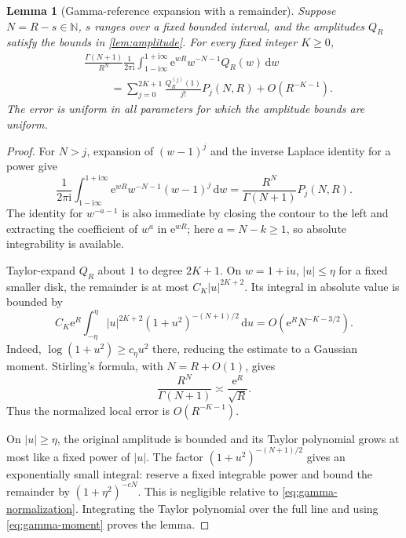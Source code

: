 \documentclass[11pt,a4paper]{article}
\numberwithin{equation}{section}
\newtheorem{lemma}[theorem]{Lemma}
\theoremstyle{definition}
\newcommand{\N}{\mathbb N}
\newcommand{\dd}{\,\mathrm d}
\newcommand{\ii}{\mathrm i}
\newcommand{\ee}{\mathrm e}
\begin{document}
\begin{lemma}[Gamma-reference expansion with a remainder]
\label{lem:gamma}
Suppose $N=R-s\in\N$, $s$ ranges over a fixed bounded interval, and the amplitudes $Q_R$ satisfy the bounds in \cref{lem:amplitude}. For every fixed integer $K\geq0$,
\begin{equation}
\begin{split}
 &\frac{\Gamma(N+1)}{R^N}\frac1{2\pi\ii}
 \int_{1-\ii\infty}^{1+\ii\infty}
 \ee^{wR}w^{-N-1}Q_R(w)\dd w\\
 &\hspace{1cm}=
 \sum_{j=0}^{2K+1}\frac{Q_R^{(j)}(1)}{j!}P_j(N,R)
 +O(R^{-K-1}).
\end{split}
\label{eq:gamma-lemma}
\end{equation}
The error is uniform in all parameters for which the amplitude bounds are uniform.
\end{lemma}

\begin{proof}
For $N>j$, expansion of $(w-1)^j$ and the inverse Laplace identity for a power give
\begin{equation}
 \frac1{2\pi\ii}\int_{1-\ii\infty}^{1+\ii\infty}
 \ee^{wR}w^{-N-1}(w-1)^j\dd w
 =\frac{R^N}{\Gamma(N+1)}P_j(N,R).
 \label{eq:gamma-moment}
\end{equation}
The identity for $w^{-a-1}$ is also immediate by closing the contour to the left and extracting the coefficient of $w^a$ in $\ee^{wR}$; here $a=N-k\geq1$, so absolute integrability is available.

Taylor-expand $Q_R$ about $1$ to degree $2K+1$. On $w=1+\ii u$, $|u|\leq\eta$ for a fixed smaller disk, the remainder is at most $C_K|u|^{2K+2}$. Its integral in absolute value is bounded by
\[
 C_K\ee^R\int_{-\eta}^{\eta}
 |u|^{2K+2}(1+u^2)^{-(N+1)/2}\dd u
 =O(\ee^R N^{-K-3/2}).
\]
Indeed, $\log(1+u^2)\geq c_\eta u^2$ there, reducing the estimate to a Gaussian moment. Stirling's formula, with $N=R+O(1)$, gives
\begin{equation}
 \frac{R^N}{\Gamma(N+1)}\asymp\frac{\ee^R}{\sqrt R}.
 \label{eq:gamma-normalization}
\end{equation}
Thus the normalized local error is $O(R^{-K-1})$.

On $|u|\geq\eta$, the original amplitude is bounded and its Taylor polynomial grows at most like a fixed power of $|u|$. The factor $(1+u^2)^{-(N+1)/2}$ gives an exponentially small integral: reserve a fixed integrable power and bound the remainder by $(1+\eta^2)^{-cN}$. This is negligible relative to \eqref{eq:gamma-normalization}. Integrating the Taylor polynomial over the full line and using \eqref{eq:gamma-moment} proves the lemma.
\end{proof}
\end{document}
